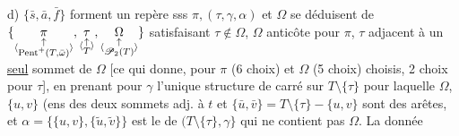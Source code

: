 
d) $\{\bar s,\bar a,\bar f\}$ forment un repère sss $\pi,(\tau,\gamma,\alpha)$ et $\Omega$ se déduisent de
$\{\underset{\inserted{\substack{\uparrow\\\mathrm{Pent}^+(T,\bar\omega)}}}{\pi},
\underset{\inserted{\substack{\uparrow\\T}}}{\tau},
\underset{\inserted{\substack{\uparrow\\\mathscr P_2(T)}}}{\Omega}\}$
satisfaisant $\tau\notin\Omega$, $\Omega$ anticôte pour $\pi$, $\tau$ adjacent  à un \uline{seul} sommet de $\Omega$
[ce qui donne, pour  $\pi$ (6 choix) et $\Omega$ (5  choix) choisis, 2 choix pour $\tau$], en prenant pour $\gamma$ l'unique structure de carré sur $T\setminus\{\tau\}$ pour laquelle $\Omega$, $\{u,v\}$ (ens des deux sommets adj. à $t$ \unsure{\}|)} et $\{\bar u,\bar v\}=T\setminus\{\tau\}-\{u,v\}$ sont des arêtes, et $\alpha=\{\{u,v\},\{\tilde u,\tilde v\}\}$ est le  de $(T\setminus\{\tau\},\gamma\}$ qui ne contient pas $\Omega$. La donnée

